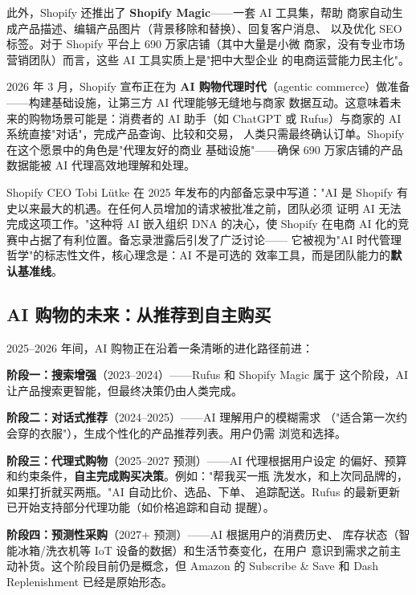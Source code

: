 此外，Shopify 还推出了 \textbf{Shopify Magic}——一套 AI 工具集，帮助
商家自动生成产品描述、编辑产品图片（背景移除和替换）、回复客户消息、
以及优化 SEO 标签。对于 Shopify 平台上 690 万家店铺（其中大量是小微
商家，没有专业市场营销团队）而言，这些 AI 工具实质上是"把中大型企业
的电商运营能力民主化"。

2026 年 3 月，Shopify 宣布正在为 \textbf{AI 购物代理时代}（agentic
commerce）做准备——构建基础设施，让第三方 AI 代理能够无缝地与商家
数据互动。这意味着未来的购物场景可能是：消费者的 AI 助手（如 ChatGPT
或 Rufus）与商家的 AI 系统直接"对话"，完成产品查询、比较和交易，
人类只需最终确认订单。Shopify 在这个愿景中的角色是"代理友好的商业
基础设施"——确保 690 万家店铺的产品数据能被 AI 代理高效地理解和处理。

Shopify CEO Tobi L\"{u}tke 在 2025 年发布的内部备忘录中写道："AI 是
Shopify 有史以来最大的机遇。在任何人员增加的请求被批准之前，团队必须
证明 AI 无法完成这项工作。"这种将 AI 嵌入组织 DNA 的决心，使 Shopify
在电商 AI 化的竞赛中占据了有利位置。备忘录泄露后引发了广泛讨论——
它被视为"AI 时代管理哲学"的标志性文件，核心理念是：AI 不是可选的
效率工具，而是团队能力的\textbf{默认基准线}。


\subsection{AI 购物的未来：从推荐到自主购买}
\label{subsec:shopping-future}

2025--2026 年间，AI 购物正在沿着一条清晰的进化路径前进：

\textbf{阶段一：搜索增强}（2023--2024）——Rufus 和 Shopify Magic 属于
这个阶段，AI 让产品搜索更智能，但最终决策仍由人类完成。

\textbf{阶段二：对话式推荐}（2024--2025）——AI 理解用户的模糊需求
（"适合第一次约会穿的衣服"），生成个性化的产品推荐列表。用户仍需
浏览和选择。

\textbf{阶段三：代理式购物}（2025--2027 预测）——AI 代理根据用户设定
的偏好、预算和约束条件，\textbf{自主完成购买决策}。例如："帮我买一瓶
洗发水，和上次同品牌的，如果打折就买两瓶。"AI 自动比价、选品、下单、
追踪配送。Rufus 的最新更新已开始支持部分代理功能（如价格追踪和自动
提醒）。

\textbf{阶段四：预测性采购}（2027+ 预测）——AI 根据用户的消费历史、
库存状态（智能冰箱/洗衣机等 IoT 设备的数据）和生活节奏变化，在用户
意识到需求之前主动补货。这个阶段目前仍是概念，但 Amazon 的 Subscribe
\& Save 和 Dash Replenishment 已经是原始形态。

